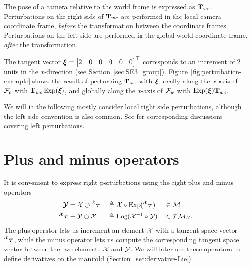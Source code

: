 \begin{example}[frametitle=Local and global perturbations on poses] \label{ex:local-global-pert}
{
  \centering
  \captionsetup{type=figure}
  \label{fig:perturbation-example}
  \par
}
The pose of a camera relative to the world frame is expressed as ${\boldsymbol{\mathbf{T}}}_{wc}$.
Perturbations on the right side of ${\boldsymbol{\mathbf{T}}}_{wc}$ are performed in the local camera coordinate frame, \emph{before} the transformation between the coordinate frames.
Perturbations on the left side are performed in the global world coordinate frame, \emph{after} the transformation.

The tangent vector ${\boldsymbol{\mathbf{\xi}}} = \begin{bmatrix}2 & 0 & 0 & 0 & 0 & 0\end{bmatrix}^{\top}$ corresponds to an increment of 2 units in the $x$-direction (see Section~\ref{sec:SE3_group}).
Figure~\ref{fig:perturbation-example} shows the result of perturbing ${\boldsymbol{\mathbf{T}}}_{wc}$ with ${\boldsymbol{\mathbf{\xi}}}$ locally along the $x$-axis of $\mathcal{F}_c$ with ${\boldsymbol{\mathbf{T}}}_{wc}\operatorname*{Exp}({\boldsymbol{\mathbf{\xi}}})$, and globally along the $x$-axis of $\mathcal{F}_w$ with $\operatorname*{Exp}({\boldsymbol{\mathbf{\xi}}}){\boldsymbol{\mathbf{T}}}_{wc}$.
\end{example}

We will in the following mostly consider local right side perturbations, although the left side convention is also common.
See \cite{SolaARobotics, barfoot2017state} for corresponding discussions covering left perturbations.


\section{Plus and minus operators} \label{sec:lie-plus-and-minus}
It is convenient to express right perturbations using the right plus and minus operators
\begin{alignat}{3}
  \mathcal{Y} &= \mathcal{X} \oplus \prescript{\mathcal{X}}{}{{\boldsymbol{\mathbf{\tau}}}} &&\triangleq \mathcal{X} \circ \operatorname*{Exp}(\prescript{\mathcal{X}}{}{{\boldsymbol{\mathbf{\tau}}}}) &&\in \mathcal{M} \label{eq:lie-plus-def}\\
  \prescript{\mathcal{X}}{}{{\boldsymbol{\mathbf{\tau}}}} &= \mathcal{Y} \ominus \mathcal{X} &&\triangleq \operatorname*{Log}(\mathcal{X}^{-1} \circ \mathcal{Y}) &&\in \mathcal{T}\mathcal{M}_{\mathcal{X}}. \label{eq:lie-minus-def}
\end{alignat}
The plus operator lets us increment an element $\mathcal{X}$ with a tangent space vector $\prescript{\mathcal{X}}{}{{\boldsymbol{\mathbf{\tau}}}}$, while the minus operator lets us compute the corresponding tangent space vector between the two elements $\mathcal{X}$ and $\mathcal{Y}$.
We will later use these operators to define derivatives on the manifold (Section~\ref{sec:derivative-Lie}).


